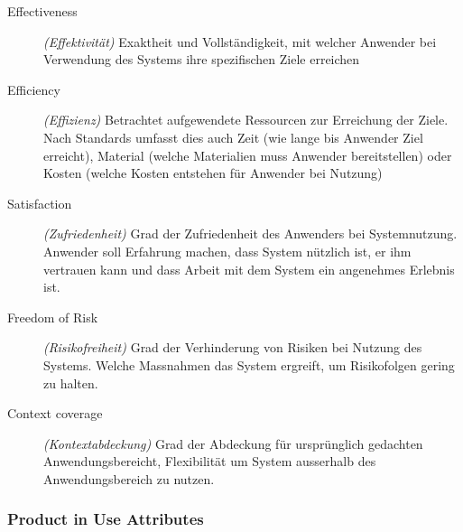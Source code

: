 \documentclass[a4paper]{article}
\begin{document}
			\begin{description}
				\item[Effectiveness] \textit{(Effektivität) }
				Exaktheit und Vollständigkeit, mit welcher Anwender bei Verwendung des Systems ihre spezifischen Ziele erreichen
				
				\item[Efficiency] \textit{(Effizienz)} 
				Betrachtet aufgewendete Ressourcen zur Erreichung der Ziele.
				Nach Standards umfasst dies auch Zeit (wie lange bis Anwender Ziel erreicht), Material (welche Materialien muss Anwender bereitstellen) oder Kosten (welche Kosten entstehen für Anwender bei Nutzung)
				
				\item[Satisfaction] \textit{(Zufriedenheit)} 
				Grad der Zufriedenheit des Anwenders bei Systemnutzung.
				Anwender soll Erfahrung machen, dass System nützlich ist, er ihm vertrauen kann und dass Arbeit mit dem System ein angenehmes Erlebnis ist.
				
				\item[Freedom of Risk] \textit{(Risikofreiheit)} 
				Grad der Verhinderung von Risiken bei Nutzung des Systems.
				Welche Massnahmen das System ergreift, um Risikofolgen gering zu halten.
				
				\item[Context coverage] \textit{(Kontextabdeckung)} 
				Grad der Abdeckung für ursprünglich gedachten Anwendungsbereicht, Flexibilität um System ausserhalb des Anwendungsbereich zu nutzen.
			\end{description}
		
			\subsubsection{Product in Use Attributes}
		
\end{document}
